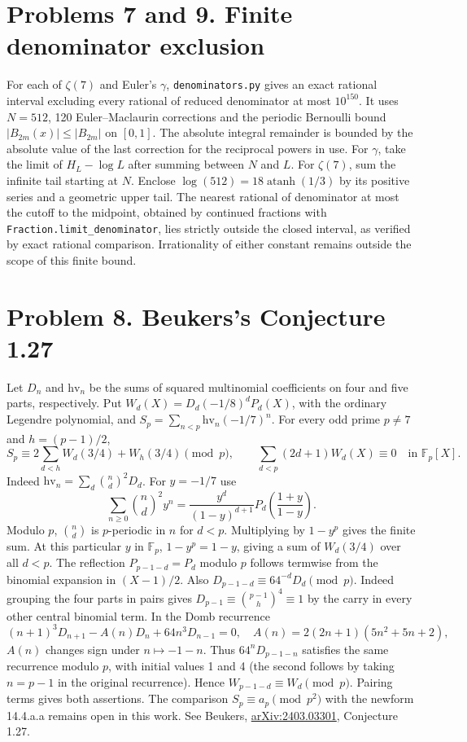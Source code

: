 \documentclass[11pt,a4paper]{article}
\begin{document}
\section{Problems 7 and 9. Finite denominator exclusion}
For each of $\zeta(7)$ and Euler's $\gamma$, \texttt{denominators.py} gives an exact rational interval excluding every rational of reduced denominator at most $10^{150}$. It uses $N=512$, 120 Euler--Maclaurin corrections and the periodic Bernoulli bound $|B_{2m}(x)|\le|B_{2m}|$ on $[0,1]$. The absolute integral remainder is bounded by the absolute value of the last correction for the reciprocal powers in use. For $\gamma$, take the limit of $H_L-\log L$ after summing between $N$ and $L$. For $\zeta(7)$, sum the infinite tail starting at $N$. Enclose $\log(512)=18\operatorname{atanh}(1/3)$ by its positive series and a geometric upper tail. The nearest rational of denominator at most the cutoff to the midpoint, obtained by continued fractions with \texttt{Fraction.limit\_denominator}, lies strictly outside the closed interval, as verified by exact rational comparison. Irrationality of either constant remains outside the scope of this finite bound.

\section{Problem 8. Beukers's Conjecture 1.27}
Let $D_n$ and $\mathrm{hv}_n$ be the sums of squared multinomial coefficients on four and five parts, respectively. Put $W_d(X)=D_d(-1/8)^dP_d(X)$, with the ordinary Legendre polynomial, and $S_p=\sum_{n<p}\mathrm{hv}_n(-1/7)^n$. For every odd prime $p\ne7$ and $h=(p-1)/2$,
\[
 S_p\equiv 2\sum_{d<h}W_d(3/4)+W_h(3/4)\pmod p,\qquad
 \sum_{d<p}(2d+1)W_d(X)\equiv0 \quad\text{in }\mathbb F_p[X].
\]
Indeed $\mathrm{hv}_n=\sum_d\binom nd^2D_d$. For $y=-1/7$ use
\[
 \sum_{n\ge0}\binom nd^2y^n
 =\frac{y^d}{(1-y)^{d+1}}P_d\!\left(\frac{1+y}{1-y}\right).
\]
Modulo $p$, $\binom nd$ is $p$-periodic in $n$ for $d<p$. Multiplying by $1-y^p$ gives the finite sum. At this particular $y$ in $\mathbb F_p$, $1-y^p=1-y$, giving a sum of $W_d(3/4)$ over all $d<p$. The reflection $P_{p-1-d}=P_d$ modulo $p$ follows termwise from the binomial expansion in $(X-1)/2$. Also $D_{p-1-d}\equiv64^{-d}D_d\pmod p$. Indeed grouping the four parts in pairs gives $D_{p-1}\equiv\binom{p-1}{h}^{4}\equiv1$ by the carry in every other central binomial term. In the Domb recurrence
\[
 (n+1)^3 D_{n+1}-A(n)D_n+64n^3D_{n-1}=0,\quad
 A(n)=2(2n+1)(5n^2+5n+2),
\]
$A(n)$ changes sign under $n\mapsto-1-n$. Thus $64^nD_{p-1-n}$ satisfies the same recurrence modulo $p$, with initial values 1 and 4 (the second follows by taking $n=p-1$ in the original recurrence). Hence $W_{p-1-d}\equiv W_d\pmod p$. Pairing terms gives both assertions. The comparison $S_p\equiv a_p\pmod{p^2}$ with the newform 14.4.a.a remains open in this work. See Beukers, \href{https://arxiv.org/abs/2403.03301}{arXiv:2403.03301}, Conjecture 1.27.
\end{document}
